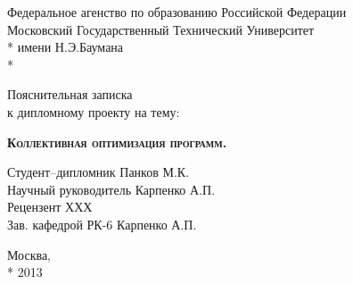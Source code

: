 \begin{titlepage}
    \newpage
    
    \begin{center}
        Федеральное агенство по образованию Российской Федерации \\
        Московский Государственный Технический Университет \\*
        имени Н.Э.Баумана \\*
        \vspace{-12mm}
        \begin{figure}[h]
        \end{figure}
        \vspace{-16mm}
        \hrulefill
    \end{center}
    \begin{center}
        \Large Пояснительная записка \\ к дипломному проекту на тему:
    \end{center}
    
    \vspace{2.5em}
    
    \begin{center}
        \textsc{\textbf{Коллективная оптимизация программ.}}
    \end{center}
    
    \vspace{6em}
    
    \begin{flushleft}
        \hspace{6.5cm}Студент--дипломник \hrulefill Панков М.К. \\
        \vspace{1.5em}
        \hspace{6.5cm}Научный руководитель \hrulefill Карпенко А.П.\\
        \vspace{1.5em}
        \hspace{6.5cm}Рецензент \hrulefill ХХХ\\
        \vspace{1.5em}
        \hspace{6.5cm}Зав. кафедрой РК-6 \hrulefill Карпенко А.П.
    \end{flushleft}
    
    \vspace{\fill}
    
    \begin{center}
        Москва, \\*
        2013
    \end{center}

\end{titlepage}